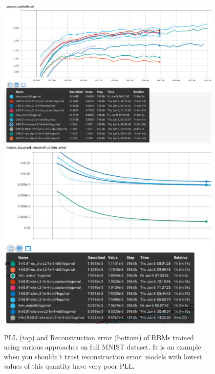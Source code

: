 \begin{figure}[h]
\begin{mdframed}
\centering
\includegraphics[width=4.6in]{rbm-mnist/rbm_practical_full.png}
\\[1em]
\includegraphics[width=4.6in]{rbm-mnist/recon_full.png}
\caption{PLL (top) and Reconstruction error (bottom) of RBMs trained using various approaches on full MNIST dataset. It is an example when you shouldn't trust reconstruction error: models with lowest values of this quantity have very poor PLL.}
\end{mdframed}
\end{figure}

\clearpage

